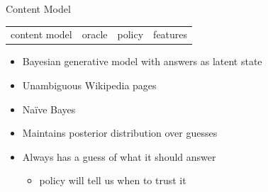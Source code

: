 \begin{frame}{Content Model}

\begin{block}{}
  \begin{center}
    \vspace{-.5cm}
    \begin{tabular}{cccc}
      \alert{content model} & oracle & policy & features \\
    \end{tabular}
    \vspace{-.5cm}
  \end{center}
\end{block}


  \begin{itemize}
   \item Bayesian generative model with answers as latent state
         \item Unambiguous Wikipedia pages
           \item Na\"ive Bayes
    \item Maintains posterior distribution over guesses
    \item Always has a guess of what it should answer
      \begin{itemize}
        \item policy will tell us when to trust it
       \end{itemize}

  \end{itemize}
\end{frame}

